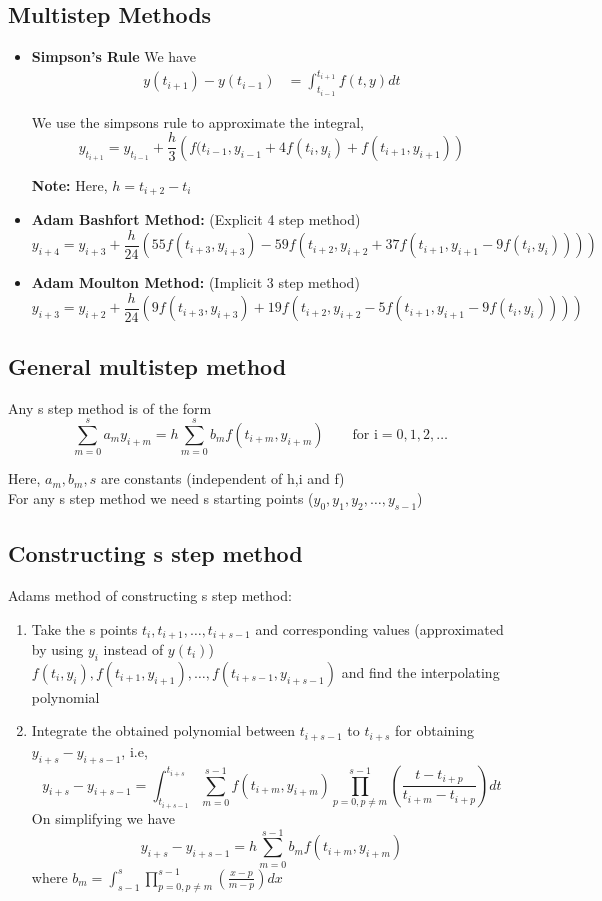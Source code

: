 \documentclass{article}
\begin{document}
	\subsection{Multistep Methods}
	\begin{itemize}
		\item \textbf{Simpson's Rule}
			We have 
			\begin{align*}
				y(t_{i+1})- y(t_{i-1}) &= \int_{t_{i-1}}^{t_{i+1}} f(t,y)dt
			\end{align*}

			We use the simpsons rule to approximate the integral,
			\begin{equation*}
				\boxed{y_{t_{i+1}} = y_{t_{i-1}} + \frac{h}{3}\left( f(t_{i-1},y_{i-1} + 4 f(t_i,y_i)+ f(t_{i+1},y_{i+1}) \right)}
			\end{equation*}

		\textbf{Note:} Here, $h = t_{i+2}- t_i$

		\item \textbf{Adam Bashfort Method:} (Explicit 4 step method)
		\[y_{i+4} = y_{i+3} + \frac{h}{24}(55f(t_{i+3},y_{i+3})- 59 f(t_{i+2},y_{i+2}+ 37 f(t_{i+1},y_{i+1}-9f(t_i,y_i)))) \]
		\item \textbf{Adam Moulton Method:} (Implicit 3 step method)
		\[y_{i+3} = y_{i+2} + \frac{h}{24}(9f(t_{i+3},y_{i+3})+ 19 f(t_{i+2},y_{i+2}-5 f(t_{i+1},y_{i+1}-9f(t_i,y_i)))) \]

	\end{itemize}

	\subsection{General multistep method}
		Any s step method is of the form 
		\[\sum_{m=0}^s a_m y_{i+m} = h\sum_{m=0}^s b_m f(t_{i+m},y_{i+m}) \qquad\text{for i}=0,1,2,\hdots\]

		Here, $a_m, b_m, s$ are constants (independent of h,i and f)\\
		For any s step method we need s starting points ($y_0,y_1,y_2,\hdots,y_{s-1}$)

	\subsection{Constructing s step method}
		Adams method of constructing s step method: 
		\begin{enumerate}
			\item Take the s points $t_i,t_{i+1},\hdots,t_{i+s-1}$ and corresponding values (approximated by using $y_i$ instead of $y(t_i)$) $f(t_i,y_i), f(t_{i+1},y_{i+1}), \hdots,f(t_{i+s-1},y_{i+s-1})$ and find the interpolating polynomial
			\item Integrate the obtained polynomial between $t_{i+s-1}$ to $t_{i+s}$ for obtaining $y_{i+s}- y_{i+s-1}$, i.e,
			\[y_{i+s}- y_{i+s-1} = \int_{t_{i+s-1}}^{t_{i+s}} \sum_{m=0}^{s-1} f(t_{i+m},y_{i+m}) \prod_{p=0,p\neq m}^{s-1} \left( \frac{t-t_{i+p}}{t_{i+m} - t_{i+p}}\right)dt \]
			On simplifying we have 
			\[y_{i+s}- y_{i+s-1} =  h\sum_{m=0}^{s-1} b_m f(t_{i+m},y_{i+m}) \]
			where $b_m = \int_{s-1}^{s}\prod_{p=0,p\neq m}^{s-1} \left( \frac{x-p}{m - p}\right)dx$
		\end{enumerate}
\end{document}
